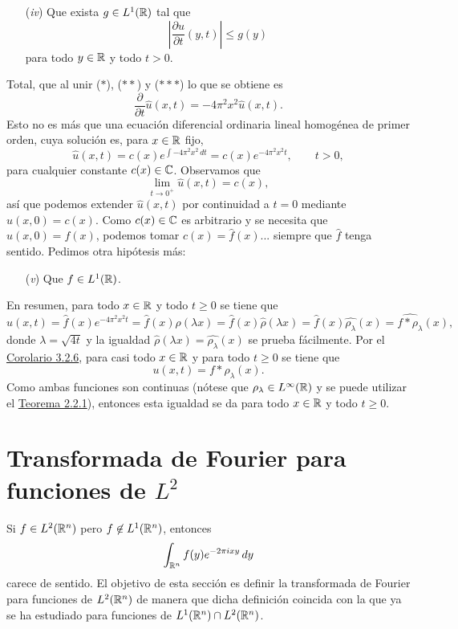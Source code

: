 \documentclass[a4paper, 11pt, oneside]{report}
\begin{document}
\begin{example}
  \begin{enumerate}
    \item[(\textit{iv})] Que exista $g \in L^1(\mathbb R)$ tal que
    \[\left|\frac{\partial u}{\partial t}(y,t) \right| \leq g(y)\]
    para todo $y \in \mathbb R$ y todo $t > 0$.
  \end{enumerate}
  Total, que al unir ($\ast$), ($\ast\ast$) y ($\ast\ast\ast$) lo que se obtiene es
  \[\frac{\partial}{\partial t}\widehat{u}(x,t) = -4\pi^2x^2\widehat{u}(x,t).\]
  Esto no es más que una ecuación diferencial ordinaria lineal homogénea de primer orden, cuya solución es, para $x \in \mathbb R$ fijo,
  \[\widehat{u}(x,t) = c(x)e^{\int-4\pi^2x^2 \, dt} = c(x)e^{-4\pi^2x^2t}, \qquad t > 0,\]
  para cualquier constante $c(x) \in \mathbb C$. Observamos que
  \[\lim_{t \to 0^+} \widehat{u}(x,t) = c(x),\]
  así que podemos extender $\widehat{u}(x,t)$ por continuidad a $t = 0$ mediante $\widehat{u}(x,0) = c(x)$. Como $c(x) \in \mathbb C$ es arbitrario y se necesita que $u(x,0) = f(x)$, podemos tomar $c(x) = \widehat{f}(x)$... siempre que $\widehat{f}$ tenga sentido. Pedimos otra hipótesis más:
  \begin{enumerate}
    \item[(\textit{v})] Que $f \in L^1(\mathbb R)$.
  \end{enumerate} 
  En resumen, para todo $x \in \mathbb R$ y todo $t \geq 0$ se tiene que
  \[\widehat{u}(x,t) = \widehat{f}(x)e^{-4\pi^2x^2t} = \widehat{f}(x)\rho(\lambda x) = \widehat{f}(x)\widehat{\rho}(\lambda x) = \widehat{f}(x)\widehat{\rho_\lambda}(x) = \widehat{f \ast \rho_\lambda}(x),\]
  donde $\lambda = \sqrt{4 t}$ y la igualdad $\widehat{\rho}(\lambda x) = \widehat{\rho_\lambda}(x)$ se prueba fácilmente. Por el \hyperref[cor:3.2.6]{\color{c1}Corolario 3.2.6}, para casi todo $x \in \mathbb R$ y para todo $t \geq 0$ se tiene que \[u(x,t) = f \ast \rho_\lambda(x).\] 
  Como ambas funciones son continuas (nótese que $\rho_\lambda \in L^\infty(\mathbb R)$ y se puede utilizar el \hyperref[teo:2.2.1]{\color{c1}Teorema 2.2.1}), entonces esta igualdad se da para todo $x \in \mathbb R$ y todo $t \geq 0$.
\end{example}

\section[Transformada de Fourier para funciones de \texorpdfstring{$L^2$}{L2}]{Transformada de Fourier para funciones de \texorpdfstring{\boldmath$L^2$}{L2}}

Si $f \in L^2(\mathbb R^n)$ pero $f \not\in L^1(\mathbb R^n)$, entonces \[\int_{\mathbb R^n} f(y)e^{-2\pi i xy} \, dy\] carece de sentido. El objetivo de esta sección es definir la transformada de Fourier para funciones de $L^2(\mathbb R^n)$ de manera que dicha definición coincida con la que ya se ha estudiado para funciones de $L^1(\mathbb R^n) \cap L^2(\mathbb R^n)$.
\end{document}
